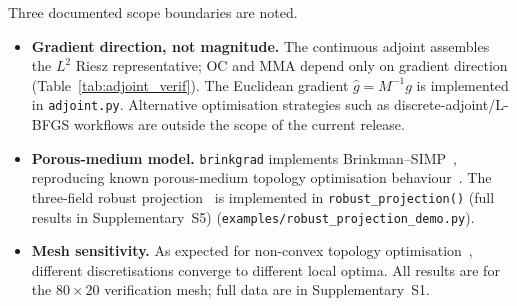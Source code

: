 Three documented scope boundaries are noted.
\begin{itemize}
    \item \textbf{Gradient direction, not magnitude.}
          The continuous adjoint assembles the $L^2$ Riesz representative;
          OC and MMA depend only on gradient direction
          (Table~\ref{tab:adjoint_verif}).
          The Euclidean gradient $\hat{g}=M^{-1}g$ is implemented
          in \texttt{adjoint.py}.
          Alternative optimisation strategies such as
          discrete-adjoint/L-BFGS workflows are outside
          the scope of the current release.

    \item \textbf{Porous-medium model.}
          \texttt{brinkgrad} implements Brinkman--SIMP~\cite{borrvall2003},
          reproducing known porous-medium topology optimisation
          behaviour~\cite{lazarov2016}.
          The three-field robust projection~\cite{wang2011}
          is implemented in \texttt{robust\_projection()}
          (full results in Supplementary~S5)
          (\texttt{examples/robust\_projection\_demo.py}).

    \item \textbf{Mesh sensitivity.}
          As expected for non-convex topology
          optimisation~\cite{lazarov2016}, different discretisations
          converge to different local optima.
          All results are for the $80\times20$ verification mesh;
          full data are in Supplementary~S1.
\end{itemize}
